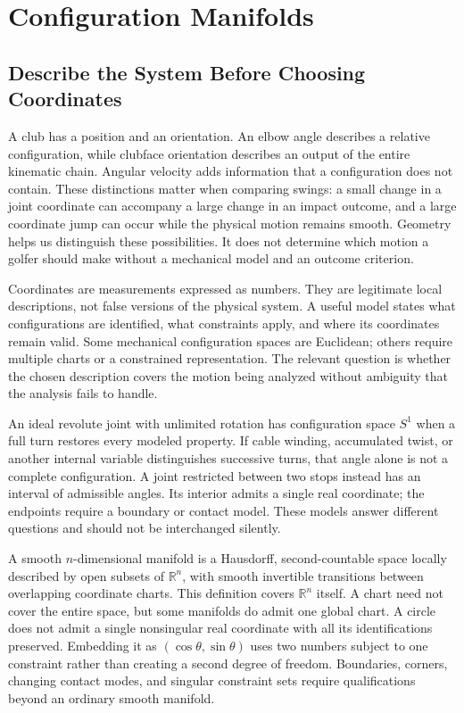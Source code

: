 \documentclass[12pt, openany]{book}
\theoremstyle{plain}
\begin{document}
\setcounter{chapter}{2}

\chapter{Configuration Manifolds}
\label{ch:configuration_manifolds}

\section{Describe the System Before Choosing Coordinates}

A club has a position and an orientation. An elbow angle describes a relative
configuration, while clubface orientation describes an output of the entire
kinematic chain. Angular velocity adds information that a configuration does
not contain. These distinctions matter when comparing swings: a small change
in a joint coordinate can accompany a large change in an impact outcome, and
a large coordinate jump can occur while the physical motion remains smooth.
Geometry helps us distinguish these possibilities. It does not determine which
motion a golfer should make without a mechanical model and an outcome criterion.

Coordinates are measurements expressed as numbers. They are legitimate local
descriptions, not false versions of the physical system. A useful model states
what configurations are identified, what constraints apply, and where its
coordinates remain valid. Some mechanical configuration spaces are Euclidean;
others require multiple charts or a constrained representation. The relevant
question is whether the chosen description covers the motion being analyzed
without ambiguity that the analysis fails to handle.

An ideal revolute joint with unlimited rotation has configuration space $S^1$
when a full turn restores every modeled property. If cable winding, accumulated
twist, or another internal variable distinguishes successive turns, that angle
alone is not a complete configuration. A joint restricted between two stops
instead has an interval of admissible angles. Its interior admits a single
real coordinate; the endpoints require a boundary or contact model. These
models answer different questions and should not be interchanged silently.

A smooth $n$-dimensional manifold is a Hausdorff, second-countable space locally
described by open subsets of $\mathbb R^n$, with smooth invertible transitions
between overlapping coordinate charts. This definition covers $\mathbb R^n$
itself. A chart need not cover the entire space, but some manifolds do admit one
global chart. A circle does not admit a single nonsingular real coordinate
with all its identifications preserved. Embedding it as $(\cos\theta,\sin\theta)$
uses two numbers subject to one constraint rather than creating a second
degree of freedom. Boundaries, corners, changing contact modes, and singular
constraint sets require qualifications beyond an ordinary smooth manifold.
\end{document}
